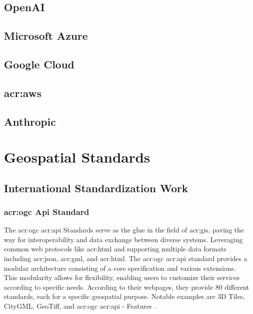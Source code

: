 \subsection{OpenAI}\label{subsec:openai}


\subsection{Microsoft Azure}\label{subsec:microsoft-azure}

\subsection{Google Cloud}\label{subsec:google-cloud}

\subsection[Amazon Web Services (AWS)]{\acrlong{acr:aws}}\label{subsec:aws}

\subsection{Anthropic}\label{subsec:anthropic}

\section{Geospatial Standards}\label{sec:geospatial-standards}

\subsection{International Standardization Work}\label{subsec:standardization-international}

\subsubsection[OGC Standards]{\acrshort{acr:ogc} Api Standard}\label{subsubsec:ogc}

The \gls{acr:ogc} \acrshort{acr:api} Standards serve as the glue in the field of \gls{acr:gis}, paving the way for interoperability and data exchange between diverse systems. Leveraging common web protocols like \acrshort{acr:html} and supporting multiple data formats including \acrshort{acr:json}, \acrshort{acr:gml}, and \acrshort{acr:html}. The \gls{acr:ogc} \acrshort{acr:api} standard provides a modular architecture consisting of a core specification and various extensions. This modularity allows for flexibility, enabling users to customize their services according to specific needs. According to their webpages, they provide 80 different standards, each for a specific geospatial purpose. Notable examples are 3D Tiles, CityGML, GeoTiff, and \acrshort{acr:ogc} \acrshort{acr:api} - Features \citep{ogcOGCStandards2023}.

